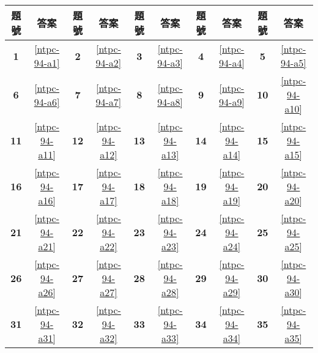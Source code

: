 \documentclass[12pt,a4paper]{report}
\begin{document}
\begin{CJK}{UTF8}{bkai}
\begin{table}[h]
  \center
  \begin{tabular}{|c|c|c|c|c|c|c|c|c|c|}
  \hline
  題號 & 答案 & 題號 & 答案 & 題號 & 答案 & 題號 & 答案 & 題號 & 答案\\
  \hline\hline
  \textbf{1}  & \ref{ntpc-94-a1} & \textbf{2}  & \ref{ntpc-94-a2} & \textbf{3}  & \ref{ntpc-94-a3} & \textbf{4}  & \ref{ntpc-94-a4} & \textbf{5}  & \ref{ntpc-94-a5}\\
  \hline
  \textbf{6}  & \ref{ntpc-94-a6} & \textbf{7}  & \ref{ntpc-94-a7} & \textbf{8}  & \ref{ntpc-94-a8} & \textbf{9}  & \ref{ntpc-94-a9} & \textbf{10} & \ref{ntpc-94-a10}\\
  \hline
  \textbf{11} & \ref{ntpc-94-a11} & \textbf{12} & \ref{ntpc-94-a12} & \textbf{13} & \ref{ntpc-94-a13} & \textbf{14} & \ref{ntpc-94-a14} & \textbf{15} & \ref{ntpc-94-a15}\\
  \hline
  \textbf{16} & \ref{ntpc-94-a16} & \textbf{17} & \ref{ntpc-94-a17} & \textbf{18} & \ref{ntpc-94-a18} & \textbf{19} & \ref{ntpc-94-a19} & \textbf{20} & \ref{ntpc-94-a20}\\
  \hline
  \textbf{21} & \ref{ntpc-94-a21} & \textbf{22} & \ref{ntpc-94-a22} & \textbf{23} & \ref{ntpc-94-a23} & \textbf{24} & \ref{ntpc-94-a24} & \textbf{25} & \ref{ntpc-94-a25}\\
  \hline
  \textbf{26} & \ref{ntpc-94-a26} & \textbf{27} & \ref{ntpc-94-a27} & \textbf{28} & \ref{ntpc-94-a28} & \textbf{29} & \ref{ntpc-94-a29} & \textbf{30} & \ref{ntpc-94-a30}\\
  \hline
  \textbf{31} & \ref{ntpc-94-a31} & \textbf{32} & \ref{ntpc-94-a32} & \textbf{33} & \ref{ntpc-94-a33} & \textbf{34} & \ref{ntpc-94-a34} & \textbf{35} & \ref{ntpc-94-a35}\\
  \hline
  \end{tabular}
\end{table}

\end{CJK}
\end{document}
